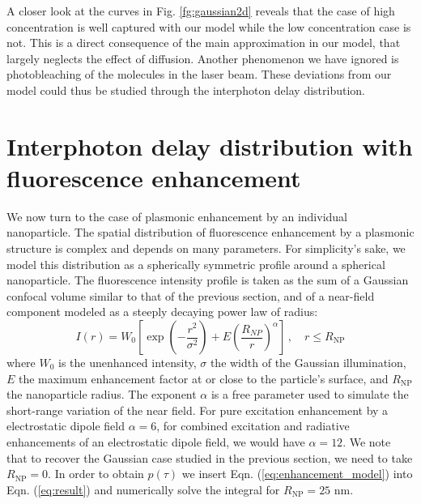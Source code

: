 A closer look at the curves in Fig. \ref{fg:gaussian2d} 
reveals that the case of high concentration is well captured 
with our model while the low concentration case is not. This is a direct 
consequence of the main approximation in our model, that largely neglects the 
effect of diffusion. Another phenomenon we have ignored is photobleaching of 
the molecules in the laser beam. These deviations from our model could thus be
studied through the interphoton delay distribution. 


\section{Interphoton delay distribution with fluorescence enhancement\label{sec:model_enha}}

We now turn to the case of plasmonic enhancement by an individual
nanoparticle. The spatial distribution of fluorescence enhancement by 
a plasmonic structure is complex and depends on many parameters. For 
simplicity's sake, we model this distribution as a spherically symmetric 
profile around a spherical nanoparticle. The fluorescence intensity 
profile is taken as the sum of a Gaussian confocal volume similar to 
that of the previous section, and of a near-field component modeled as 
a steeply decaying power law of radius: 
\begin{equation}
I(r) = W_0 \left[ \exp \left(-\frac{r^2}{\sigma^2} \right) + E \left(\frac{R_{NP}}{r}\right)^\alpha  \right]\,, 
\quad r \leq R_\textrm{NP}
\label{eq:enhancement_model}
\end{equation}
where $W_0$ is the unenhanced intensity, $\sigma$ the width of the Gaussian 
illumination, $E$ the maximum enhancement factor at or close to the 
particle's surface, and $R_\textrm{NP}$ the nanoparticle radius. The 
exponent $\alpha$ is a free parameter used to simulate the short-range 
variation of the near field. For pure excitation enhancement by a electrostatic 
dipole field $\alpha =6$, for combined excitation and radiative enhancements 
of an electrostatic dipole field, we would have $\alpha =12$.
We note that to recover the Gaussian case studied in the previous 
section, we need to take $R_\textrm{NP}=0$. In order to obtain 
$p(\tau)$ we insert Eqn. (\ref{eq:enhancement_model}) into Eqn.
(\ref{eq:result}) and numerically solve the integral for $R_\textrm{NP}=25$ nm. 

